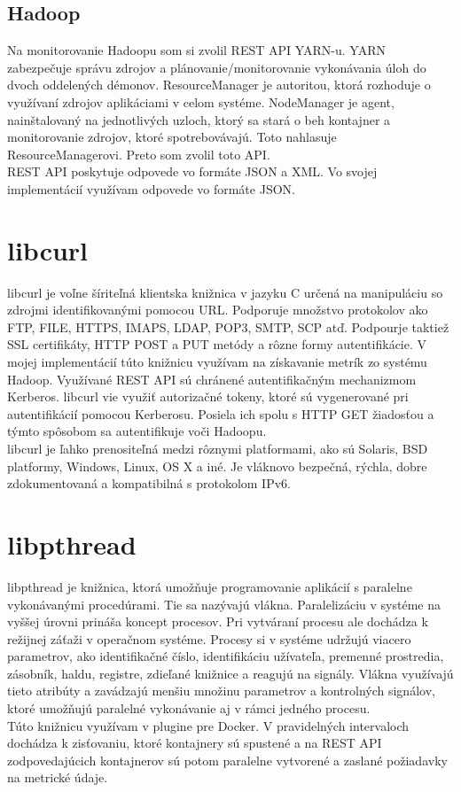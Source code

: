 \documentclass[11pt,final,oneside]{fithesis}
\begin{document}
\subsection{Hadoop}
Na monitorovanie Hadoopu som si zvolil REST API YARN-u. YARN zabezpečuje správu zdrojov a plánovanie/monitorovanie vykonávania úloh do dvoch
oddelených démonov.\cite{23} ResourceManager je autoritou, ktorá rozhoduje o využívaní zdrojov aplikáciami v celom systéme. NodeManager
je agent, nainštalovaný na jednotlivých uzloch, ktorý sa stará o beh kontajner a monitorovanie zdrojov, ktoré spotrebovávajú. Toto
nahlasuje ResourceManagerovi. Preto som zvolil toto API.
\\REST API poskytuje odpovede vo formáte JSON a XML. Vo svojej implementácií využívam odpovede vo formáte JSON.

\section{libcurl}
libcurl je voľne šíriteľná klientska knižnica v jazyku C určená na manipuláciu so zdrojmi identifikovanými pomocou URL. Podporuje
množstvo protokolov ako FTP, FILE, HTTPS, IMAPS, LDAP, POP3, SMTP, SCP atď. Podpourje taktiež SSL certifikáty,
HTTP POST a PUT metódy a rôzne formy autentifikácie. V mojej implementácií túto knižnicu využívam na získavanie metrík zo systému
Hadoop. Využívané REST API sú chránené autentifikačným mechanizmom Kerberos. libcurl vie využiť autorizačné tokeny,
ktoré sú vygenerované pri autentifikácií pomocou Kerberosu. Posiela ich spolu s HTTP GET žiadosťou a týmto spôsobom
sa autentifikuje voči Hadoopu.
\\libcurl je ľahko prenositeľná medzi rôznymi platformami, ako sú Solaris, BSD platformy, Windows, Linux, OS X a iné. Je vláknovo
bezpečná, rýchla, dobre zdokumentovaná a kompatibilná s protokolom IPv6. \cite{24}

\section{libpthread}
libpthread je knižnica, ktorá umožňuje programovanie aplikácií s paralelne vykonávanými procedúrami. Tie sa nazývajú vlákna. Paralelizáciu
v systéme na vyššej úrovni prináša koncept procesov. Pri
vytváraní procesu ale dochádza k režijnej záťaži v operačnom systéme. Procesy si v systéme udržujú viacero parametrov, ako identifikačné
číslo, identifikáciu užívateľa, premenné prostredia, zásobník, haldu, registre, zdieľané knižnice a reagujú na signály. Vlákna využívajú
tieto atribúty a zavádzajú menšiu množinu parametrov a kontrolných signálov, ktoré umožňujú paralelné vykonávanie aj v rámci jedného procesu.
\\Túto knižnicu využívam v plugine pre Docker. V pravidelných intervaloch dochádza k zisťovaniu, ktoré kontajnery sú spustené a na REST API
zodpovedajúcich kontajnerov sú potom paralelne vytvorené a zaslané požiadavky na metrické údaje.
\end{document}
